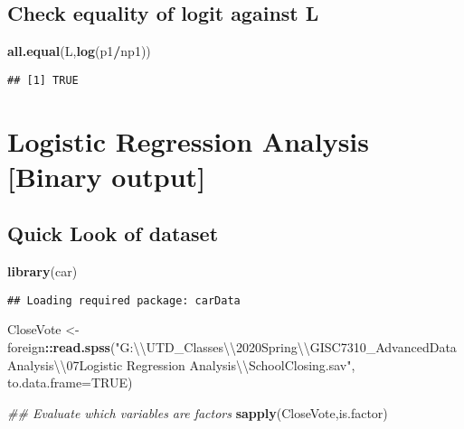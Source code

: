\documentclass[
]{article}
\newenvironment{Shaded}{\begin{snugshade}}{\end{snugshade}}
\newcommand{\CharTok}[1]{\textcolor[rgb]{0.31,0.60,0.02}{#1}}
\newcommand{\CommentTok}[1]{\textcolor[rgb]{0.56,0.35,0.01}{\textit{#1}}}
\newcommand{\DataTypeTok}[1]{\textcolor[rgb]{0.13,0.29,0.53}{#1}}
\newcommand{\KeywordTok}[1]{\textcolor[rgb]{0.13,0.29,0.53}{\textbf{#1}}}
\newcommand{\NormalTok}[1]{#1}
\newcommand{\OperatorTok}[1]{\textcolor[rgb]{0.81,0.36,0.00}{\textbf{#1}}}
\newcommand{\OtherTok}[1]{\textcolor[rgb]{0.56,0.35,0.01}{#1}}
\newcommand{\StringTok}[1]{\textcolor[rgb]{0.31,0.60,0.02}{#1}}
\begin{document}
\hypertarget{check-equality-of-logit-against-l}{%
\subsection{Check equality of logit against
L}\label{check-equality-of-logit-against-l}}

\begin{Shaded}
\begin{Highlighting}[]
\KeywordTok{all.equal}\NormalTok{(L,}\KeywordTok{log}\NormalTok{(p1}\OperatorTok{/}\NormalTok{np1))}
\end{Highlighting}
\end{Shaded}

\begin{verbatim}
## [1] TRUE
\end{verbatim}

\hypertarget{logistic-regression-analysis-binary-output}{%
\section{Logistic Regression Analysis {[}Binary
output{]}}\label{logistic-regression-analysis-binary-output}}

\hypertarget{quick-look-of-dataset}{%
\subsection{Quick Look of dataset}\label{quick-look-of-dataset}}

\begin{Shaded}
\begin{Highlighting}[]
\KeywordTok{library}\NormalTok{(car)}
\end{Highlighting}
\end{Shaded}

\begin{verbatim}
## Loading required package: carData
\end{verbatim}

\begin{Shaded}
\begin{Highlighting}[]
\NormalTok{CloseVote <-}\StringTok{ }\NormalTok{foreign}\OperatorTok{::}\KeywordTok{read.spss}\NormalTok{(}\StringTok{"G:}\CharTok{\textbackslash{}\textbackslash{}}\StringTok{UTD_Classes}\CharTok{\textbackslash{}\textbackslash{}}\StringTok{2020Spring}\CharTok{\textbackslash{}\textbackslash{}}\StringTok{GISC7310_AdvancedDataAnalysis}\CharTok{\textbackslash{}\textbackslash{}}\StringTok{07Logistic Regression Analysis}\CharTok{\textbackslash{}\textbackslash{}}\StringTok{SchoolClosing.sav"}\NormalTok{, }\DataTypeTok{to.data.frame=}\OtherTok{TRUE}\NormalTok{)}

\CommentTok{## Evaluate which variables are factors}
\KeywordTok{sapply}\NormalTok{(CloseVote,is.factor)}
\end{Highlighting}
\end{Shaded}
\end{document}
